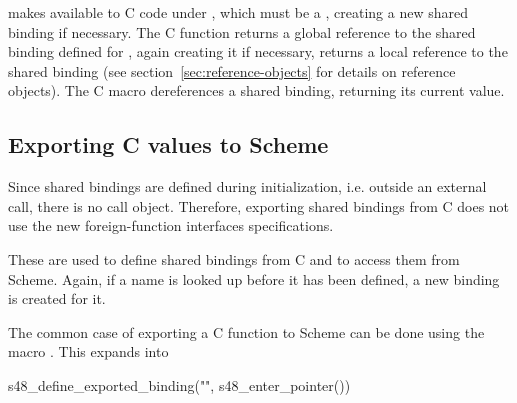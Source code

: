 \begin{protos}
\end{protos}

\begin{protos}
\end{protos}

\noindent{} makes  available to C code
under , which must be a , creating a new
shared binding if necessary.  The C function
 returns a global reference to
the shared binding defined for , again creating it if
necessary,  returns a
local reference to the shared binding (see
section~\ref{sec:reference-objects} for details on reference objects).
The C macro  dereferences a shared
binding, returning its current value.

\subsection{Exporting C values to Scheme}
\label{sec:export-c-to-scheme}

Since shared bindings are defined during initialization, i.e. outside
an external call, there is no call object.  Therefore, exporting
shared bindings from C does not use the new foreign-function
interfaces specifications.

\begin{protos}
\end{protos}

\begin{protos}
\end{protos}

\noindent These are used to define shared bindings from C and to access them
 from Scheme.
Again, if a name is looked up before it has been defined, a new binding is
 created for it.

The common case of exporting a C function to Scheme can be done using
 the macro .
This expands into
\begin{example}
s48\_define\_exported\_binding("",
                               s48\_enter\_pointer())
\end{example}

